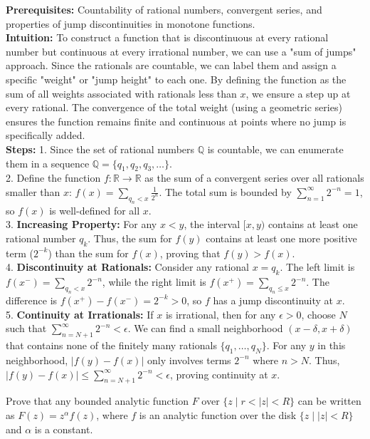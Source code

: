 \begin{solution}
\textbf{Prerequisites:} Countability of rational numbers, convergent series, and properties of jump discontinuities in monotone functions. \\[1em]
\textbf{Intuition:} To construct a function that is discontinuous at every rational number but continuous at every irrational number, we can use a "sum of jumps" approach. Since the rationals are countable, we can label them and assign a specific "weight" or "jump height" to each one. By defining the function as the sum of all weights associated with rationals less than $x$, we ensure a step up at every rational. The convergence of the total weight (using a geometric series) ensures the function remains finite and continuous at points where no jump is specifically added. \\[1em]
\textbf{Steps:}
1. Since the set of rational numbers $\mathbb{Q}$ is countable, we can enumerate them in a sequence $\mathbb{Q} = \{q_1, q_2, q_3, \dots\}$. \\[1em]
2. Define the function $f: \mathbb{R} \to \mathbb{R}$ as the sum of a convergent series over all rationals smaller than $x$:
$f(x) = \sum_{q_n < x} \frac{1}{2^n}$.
The total sum is bounded by $\sum_{n=1}^\infty 2^{-n} = 1$, so $f(x)$ is well-defined for all $x$. \\[1em]
3. \textbf{Increasing Property:} For any $x < y$, the interval $[x, y)$ contains at least one rational number $q_k$. Thus, the sum for $f(y)$ contains at least one more positive term ($2^{-k}$) than the sum for $f(x)$, proving that $f(y) > f(x)$. \\[1em]
4. \textbf{Discontinuity at Rationals:} Consider any rational $x = q_k$. The left limit is $f(x^-) = \sum_{q_n < x} 2^{-n}$, while the right limit is $f(x^+) = \sum_{q_n \leq x} 2^{-n}$. The difference is $f(x^+) - f(x^-) = 2^{-k} > 0$, so $f$ has a jump discontinuity at $x$. \\[1em]
5. \textbf{Continuity at Irrationals:} If $x$ is irrational, then for any $\epsilon > 0$, choose $N$ such that $\sum_{n=N+1}^\infty 2^{-n} < \epsilon$. We can find a small neighborhood $(x-\delta, x+\delta)$ that contains none of the finitely many rationals $\{q_1, \dots, q_N\}$. For any $y$ in this neighborhood, $|f(y) - f(x)|$ only involves terms $2^{-n}$ where $n > N$. Thus, $|f(y) - f(x)| \leq \sum_{n=N+1}^\infty 2^{-n} < \epsilon$, proving continuity at $x$.
\end{solution}

\begin{exercise}
\label{analysis:2014:9}
Prove that any bounded analytic function $F$ over $\{z\mid r<|z|<R\}$ can be written as $F(z)=z^{\alpha}f(z)$, where $f$ is an analytic function over the disk $\{z\mid |z|<R\}$ and $\alpha$ is a constant.
\end{exercise}

